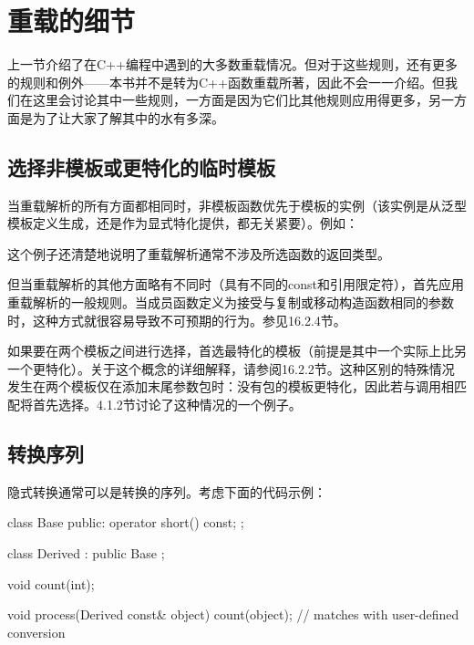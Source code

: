 \section{重载的细节}

上一节介绍了在C++编程中遇到的大多数重载情况。但对于这些规则，还有更多的规则和例外——本书并不是转为C++函数重载所著，因此不会一一介绍。但我们在这里会讨论其中一些规则，一方面是因为它们比其他规则应用得更多，另一方面是为了让大家了解其中的水有多深。

\subsection{选择非模板或更特化的临时模板}

当重载解析的所有方面都相同时，非模板函数优先于模板的实例（该实例是从泛型模板定义生成，还是作为显式特化提供，都无关紧要）。例如：


这个例子还清楚地说明了重载解析通常不涉及所选函数的返回类型。

但当重载解析的其他方面略有不同时（具有不同的const和引用限定符），首先应用重载解析的一般规则。当成员函数定义为接受与复制或移动构造函数相同的参数时，这种方式就很容易导致不可预期的行为。参见16.2.4节。

如果要在两个模板之间进行选择，首选最特化的模板（前提是其中一个实际上比另一个更特化）。关于这个概念的详细解释，请参阅16.2.2节。这种区别的特殊情况发生在两个模板仅在添加末尾参数包时：没有包的模板更特化，因此若与调用相匹配将首先选择。4.1.2节讨论了这种情况的一个例子。

\subsection{转换序列}

隐式转换通常可以是转换的序列。考虑下面的代码示例：

\begin{cpp}
class Base {
	public:
	operator short() const;
};

class Derived : public Base {
};

void count(int);

void process(Derived const& object)
{
	count(object); // matches with user-defined conversion
}
\end{cpp}

